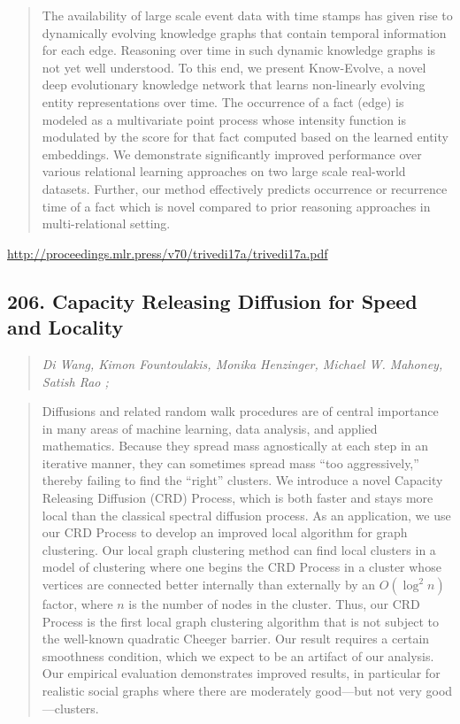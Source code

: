 \documentclass{article}
\begin{document}
\begin{quote}
    The availability of large scale event data with time stamps has given rise to dynamically evolving knowledge graphs that contain temporal information for each edge. Reasoning over time in such dynamic knowledge graphs is not yet well understood. To this end, we present Know-Evolve, a novel deep evolutionary knowledge network that learns non-linearly evolving entity representations over time. The occurrence of a fact (edge) is modeled as a multivariate point process whose intensity function is modulated by the score for that fact computed based on the learned entity embeddings. We demonstrate significantly improved performance over various relational learning approaches on two large scale real-world datasets. Further, our method effectively predicts occurrence or recurrence time of a fact which is novel compared to prior reasoning approaches in multi-relational setting.  
\end{quote}

\href{http://proceedings.mlr.press/v70/trivedi17a/trivedi17a.pdf}{http://proceedings.mlr.press/v70/trivedi17a/trivedi17a.pdf}

\subsection{206. Capacity Releasing Diffusion for Speed and Locality}

\begin{quote}
\footnotesize{\textit{Di Wang, Kimon Fountoulakis, Monika Henzinger, Michael W. Mahoney, Satish Rao ;}}

\end{quote}

\begin{quote}
    Diffusions and related random walk procedures are of central importance in many areas of machine learning, data analysis, and applied mathematics. Because they spread mass agnostically at each step in an iterative manner, they can sometimes spread mass “too aggressively,” thereby failing to find the “right” clusters. We introduce a novel Capacity Releasing Diffusion (CRD) Process, which is both faster and stays more local than the classical spectral diffusion process. As an application, we use our CRD Process to develop an improved local algorithm for graph clustering. Our local graph clustering method can find local clusters in a model of clustering where one begins the CRD Process in a cluster whose vertices are connected better internally than externally by an $O(\log^2 n)$ factor, where $n$ is the number of nodes in the cluster. Thus, our CRD Process is the first local graph clustering algorithm that is not subject to the well-known quadratic Cheeger barrier. Our result requires a certain smoothness condition, which we expect to be an artifact of our analysis. Our empirical evaluation demonstrates improved results, in particular for realistic social graphs where there are moderately good—but not very good—clusters.  
\end{quote}
\end{document}
